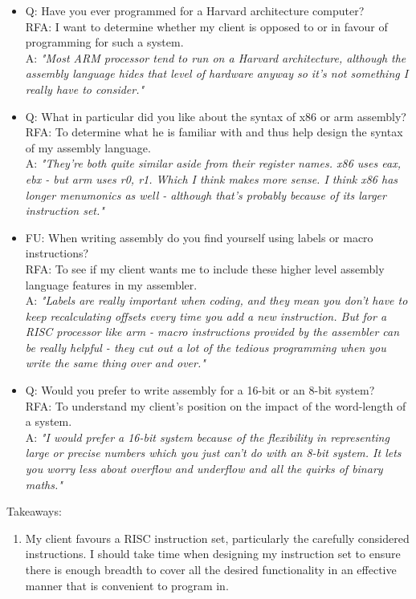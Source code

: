 \begin{enumerate}
\begin{itemize}
            \item Q: Have you ever programmed for a Harvard architecture computer? \\
                RFA: I want to determine whether my client is opposed to or in favour of programming for such a system.\\
                A: \textit{"Most ARM processor tend to run on a Harvard architecture, although the assembly language hides that level of hardware anyway so it's not something I really have to consider."}
            \item Q: What in particular did you like about the syntax of x86 or arm assembly?\\
                RFA: To determine what he is familiar with and thus help design the syntax of my assembly language. \\
                A: \textit{"They're both quite similar aside from their register names. x86 uses eax, ebx - but arm uses r0, r1.  Which I think makes more sense. I think x86 has longer menumonics as well - although that's probably because of its larger instruction set."}
            \item FU: When writing assembly do you find yourself using labels or macro instructions?\\
                RFA: To see if my client wants me to include these higher level assembly language features in my assembler.\\
                A: \textit{"Labels are really important when coding, and they mean you don't have to keep recalculating offsets every time you add a new instruction. But for a RISC processor like arm - macro instructions provided by the assembler can be really helpful - they cut out a lot of the tedious programming when you write the same thing over and over."}
            \item Q: Would you prefer to write assembly for a 16-bit or an 8-bit system? \\
                RFA: To understand my client's position on the impact of the word-length of a system.\\
                A: \textit{"I would prefer a 16-bit system because of the flexibility in representing large or precise numbers which you just can't do with an 8-bit system. It lets you worry less about overflow and underflow and all the quirks of binary maths."}
        \end{itemize}
        Takeaways:
        \begin{enumerate}
            \item My client favours a RISC instruction set, particularly the carefully considered instructions. I should take time when designing my instruction set to ensure there is enough breadth to cover all the desired functionality in an effective manner that is convenient to program in.

\end{enumerate}
\end{enumerate}
